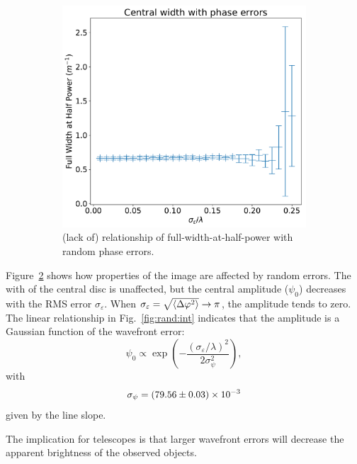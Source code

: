 \documentclass{article}
\newcommand{\eps}{\varepsilon}
\newcommand{\ph}{\varphi}
\begin{document}
\begin{figure}
\begin{subfigure}{0.45\textwidth}
        \includegraphics[width=\textwidth]{pictures/rand/size}
        \caption{(lack of) relationship of full-width-at-half-power with random phase errors.}\label{fig:rand:size}
    \end{subfigure}
    \caption{}\label{fig:rand}
\end{figure}

Figure~\ref{fig:rand} shows how properties of the image are affected by random errors. The with of the central disc is unaffected, but the central amplitude ($\psi_0$) decreases with the RMS error $\sigma_\eps$. When $\sigma_\eps = \sqrt{\expval{\Delta\ph^2}} \rightarrow \pi$, the amplitude tends to zero. The linear relationship in Fig.~\ref{fig:rand:int} indicates that the amplitude is a Gaussian function of the wavefront error:
\begin{equation}
    \psi_0 \propto \exp \left( - \frac{(\sigma_\eps / \lambda)^2}{2 \sigma_\psi^2} \right),
\end{equation}
with
\begin{equation}
    \sigma_\psi = \num{79.56 \pm 0.03 e-3}
\end{equation}
given by the line slope.

The implication for telescopes is that larger wavefront errors will decrease the apparent brightness of the observed objects.
\end{document}
